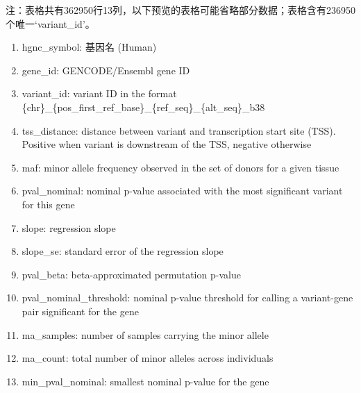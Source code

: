 \documentclass[
]{article}
\providecommand{\tightlist}{%
  \setlength{\itemsep}{0pt}\setlength{\parskip}{0pt}}
\begin{document}
\begin{center}\begin{tcolorbox}[colback=gray!10, colframe=gray!50, width=0.9\linewidth, arc=1mm, boxrule=0.5pt]注：表格共有362950行13列，以下预览的表格可能省略部分数据；表格含有236950个唯一`variant\_id'。
\end{tcolorbox}
\end{center}
\begin{center}\begin{tcolorbox}[colback=gray!10, colframe=gray!50, width=0.9\linewidth, arc=1mm, boxrule=0.5pt]\begin{enumerate}\tightlist
\item hgnc\_symbol:  基因名 (Human)
\item gene\_id:  GENCODE/Ensembl gene ID
\item variant\_id:  variant ID in the format \{chr\}\_\{pos\_first\_ref\_base\}\_\{ref\_seq\}\_\{alt\_seq\}\_b38
\item tss\_distance:  distance between variant and transcription start site (TSS). Positive when variant is downstream of the TSS, negative otherwise
\item maf:  minor allele frequency observed in the set of donors for a given tissue
\item pval\_nominal:  nominal p-value associated with the most significant variant for this gene
\item slope:  regression slope
\item slope\_se:  standard error of the regression slope
\item pval\_beta:  beta-approximated permutation p-value
\item pval\_nominal\_threshold:  nominal p-value threshold for calling a variant-gene pair significant for the gene
\item ma\_samples:  number of samples carrying the minor allele
\item ma\_count:  total number of minor alleles across individuals
\item min\_pval\_nominal:  smallest nominal p-value for the gene
\end{enumerate}\end{tcolorbox}
\end{center}
\end{document}
